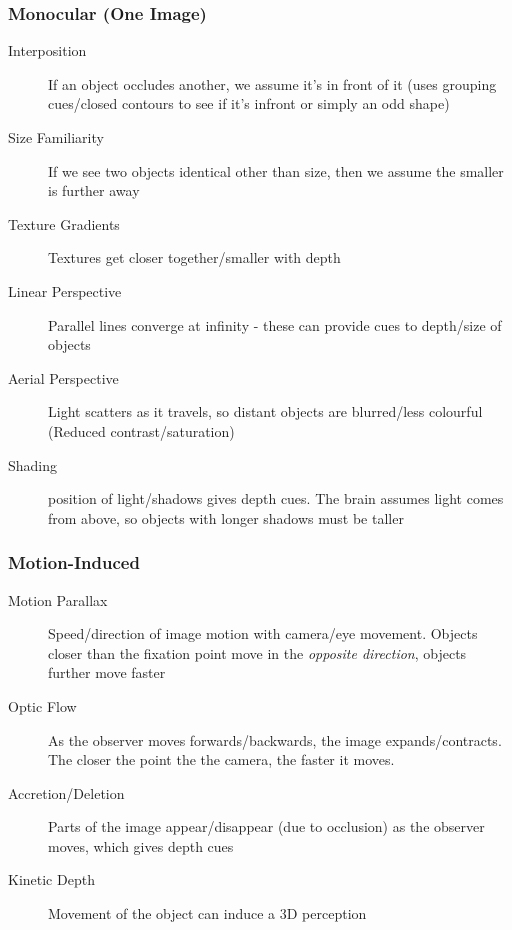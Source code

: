\subsubsection{Monocular (One Image)}
\begin{description}
    \item[Interposition] If an object occludes another, we assume it's in front of it (uses grouping cues/closed contours to see if it's infront or simply an odd shape)
    \item[Size Familiarity] If we see two objects identical other than size, then we assume the smaller is further away
    \item[Texture Gradients] Textures get closer together/smaller with depth
    \item[Linear Perspective] Parallel lines converge at infinity - these can provide cues to depth/size of objects
    \item[Aerial Perspective] Light scatters as it travels, so distant objects are blurred/less colourful (Reduced contrast/saturation)
    \item[Shading] position of light/shadows gives depth cues. The brain assumes light comes from above, so objects with longer shadows must be taller
\end{description}

\subsubsection{Motion-Induced}
\begin{description}
    \item[Motion Parallax] Speed/direction of image motion with camera/eye movement. Objects closer than the fixation point move in the \emph{opposite direction}, objects further move faster
    \item[Optic Flow] As the observer moves forwards/backwards, the image expands/contracts. The closer the point the the camera, the faster it moves.
    \item[Accretion/Deletion] Parts of the image appear/disappear (due to occlusion) as the observer moves, which gives depth cues
    \item[Kinetic Depth] Movement of the object can induce a 3D perception
\end{description}




